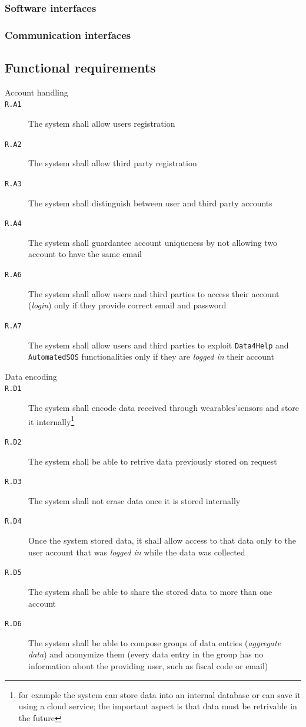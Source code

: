     \subsubsection{Software interfaces}
    \subsubsection{Communication interfaces}

  \subsection{Functional requirements}

    \begin{description}
      \item[Account handling]
      \item[\texttt{R.A1}] The system shall allow users registration
      \item[\texttt{R.A2}] The system shall allow third party registration
      \item[\texttt{R.A3}] The system shall distinguish between user and third party accounts
      \item[\texttt{R.A4}] The system shall guardantee account uniqueness by not allowing two account to have the same email
      \item[\texttt{R.A6}] The system shall allow users and third parties to access their account (\textit{login}) only if they provide correct email and password
      \item[\texttt{R.A7}] The system shall allow users and third parties to exploit \texttt{Data4Help} and \texttt{AutomatedSOS} functionalities only if they are \textit{logged in} their account

      \item[Data encoding]
      \item[\texttt{R.D1}] The system shall encode data received through wearables'sensors and store it internally\footnote{for example the system can store data into an internal database or can save it using a cloud service; the important aspect is that data must be retrivable in the future}
      \item[\texttt{R.D2}] The system shall be able to retrive data previously stored on request
      \item[\texttt{R.D3}] The system shall not erase data once it is stored internally
      \item[\texttt{R.D4}] Once the system stored data, it shall allow access to that data only to the user account that was \textit{logged in} while the data was collected
      \item[\texttt{R.D5}] The system shall be able to share the stored data to more than one account
      \item[\texttt{R.D6}] The system shall be able to compose groups of data entries (\textit{aggregate data}) and anonymize them (every data entry in the group has no information about the providing user, such as fiscal code or email)


\end{description}
